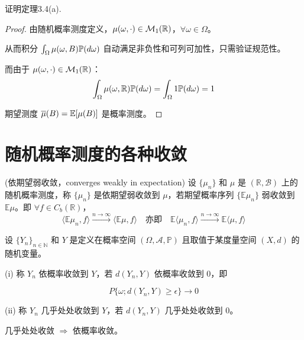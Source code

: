\begin{7}
    证明定理3.4(a).
\end{7}

\begin{proof}
    由随机概率测度定义，$\mu(\omega, \cdot) \in \mathcal{M}_1(\mathbb{R})$，$\forall \omega \in \Omega$。

从而积分 $\int_{\Omega} \mu(\omega, B) \mathbb{P}(d\omega)$ 自动满足非负性和可列可加性，只需验证规范性。

而由于 $\mu(\omega, \cdot) \in \mathcal{M}_1(\mathbb{R})$：
\[
\int_{\Omega} \mu(\omega, \mathbb{R}) \mathbb{P}(d\omega) = \int_{\Omega} 1  \mathbb{P}(d\omega) = 1
\]

期望测度 $\overline{\mu}(B) = \mathbb{E}[\mu(B)]$ 是概率测度。
\end{proof}

\section{随机概率测度的各种收敛}

\begin{definition}{(依期望弱收敛，converges weakly in expectation)}
    设 \(\{\mu_n\}\) 和 \(\mu\) 是 \((\mathbb{R}, \mathcal{B})\) 上的随机概率测度，称 \(\{\mu_n\}\) 是依期望弱收敛到 \(\mu\)，若期望概率序列 \(\{\mathbb{E}\mu_n\}\) 弱收敛到 \(\mathbb{E}\mu\)。即 \(\forall f \in C_b(\mathbb{R})\)，
\begin{equation*}
\langle \mathbb{E} \mu_n, f \rangle \xrightarrow{n \to \infty} \langle \mathbb{E} \mu, f \rangle \quad\text{亦即}\quad \mathbb{E} \langle \mu_n, f \rangle \xrightarrow{n \to \infty} \mathbb{E} \langle \mu, f \rangle
\end{equation*}
\end{definition}

\begin{definition}
     设 \(\{Y_n\}_{n \in \mathbb{N}}\) 和 \(Y\) 是定义在概率空间 \((\Omega, \mathcal{A}, \mathbb{P})\) 且取值于某度量空间 \((X, d)\) 的随机变量。

(i) 称 \(Y_n\) 依概率收敛到 \(Y\)，若 \(d(Y_n, Y)\) 依概率收敛到 \(0\)，即

\begin{equation*}
P \{\omega; d(Y_n, Y) \geq \epsilon \} \to 0
\end{equation*}

(ii) 称 \(Y_n\) 几乎处处收敛到 \(Y\)，若 \(d(Y_n, Y)\) 几乎处处收敛到 \(0\)。

\end{definition}
\begin{remark}
    几乎处处收敛 \(\Rightarrow\) 依概率收敛。
\end{remark}

